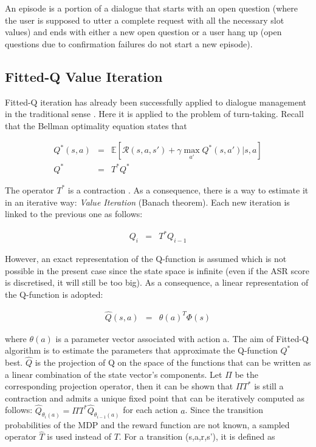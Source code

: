         An episode is a portion of a dialogue that starts with an open question (where the user is supposed to utter a complete request with all the necessary slot values) and ends with either a new open question or a user hang up (open questions due to confirmation failures do not start a new episode).
            
	\subsection{Fitted-Q Value Iteration}
    
    	Fitted-Q iteration has already been successfully applied to dialogue management in the traditional sense \cite{Chandramohan2010}. Here it is applied to the problem of turn-taking. Recall that the Bellman optimality equation states that
			
			\begin{eqnarray}
				Q^*(s,a) & = & \mathbb{E}[\mathscr{R} (s,a,s') + \gamma \max_{a'} Q^*(s,a') | s, a] \\
				Q^* & = & T^* Q^*
			\end{eqnarray}
			
				The operator $T^*$ is a contraction \cite{Bellman1957}. As a consequence, there is a way to estimate it in an iterative way: \textit{Value Iteration} (Banach theorem). Each new iteration is linked to the previous one as follows:
        
			\begin{eqnarray}
				Q_i & = & T^* Q_{i-1}
			\end{eqnarray}
						
					However, an exact representation of the Q-function is assumed which is not possible in the present case since the state space is infinite (even if the ASR score is discretised, it will still be too big). As a consequence, a linear representation of the Q-function is adopted:
        
			\begin{eqnarray}
				\hat{Q}(s,a) & = & \theta(a)^T \Phi(s)
			\end{eqnarray}
            
      	where $\theta(a)$ is a parameter vector associated with action a. The aim of Fitted-Q algorithm is to estimate the parameters that approximate the Q-function $Q^*$ best. $\hat{Q}$ is the projection of Q on the space of the functions that can be written as a linear combination of the state vector's components. Let $\Pi$ be the corresponding projection operator, then it can be shown that $\Pi T^*$ is still a contraction and admits a unique fixed point that can be iteratively computed as follows: $\hat{Q}_{\theta_i (a)} = \Pi T^* \hat{Q}_{\theta_{i-1} (a)}$ for each action $a$. Since the transition probabilities of the MDP and the reward function are not known, a sampled operator $\hat{T}$ is used instead of $T$. For a transition (s,a,r,s'), it is defined as
        
